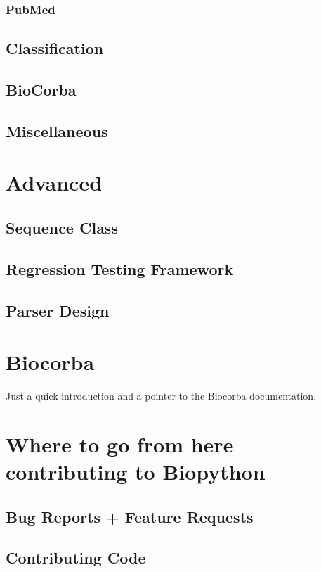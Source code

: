 \documentclass[dvips]{article}
\begin{document}
\subsubsection{PubMed}

\subsection{Classification}

\subsection{BioCorba}

\subsection{Miscellaneous}



\section{Advanced}

\subsection{Sequence Class}

\subsection{Regression Testing Framework}

\subsection{Parser Design}



\section{Biocorba}

Just a quick introduction and a pointer to the
Biocorba documentation.


\section{Where to go from here -- contributing to
Biopython}

\subsection{Bug Reports + Feature
Requests}

\subsection{Contributing Code}
\end{document}
